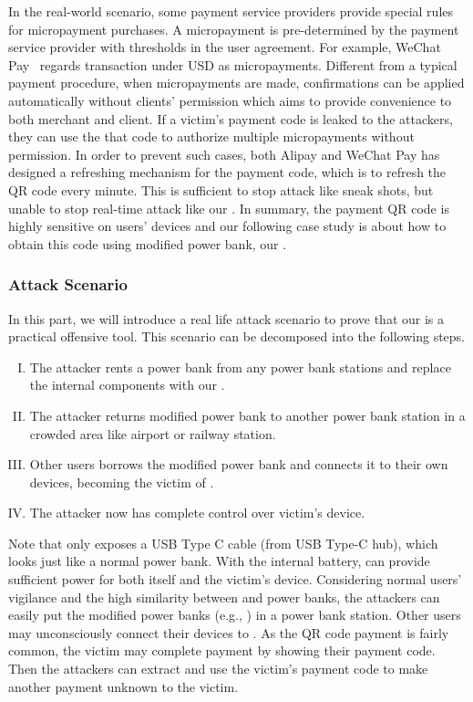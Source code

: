 In the real-world scenario, some payment service providers provide special rules for micropayment purchases. 
A micropayment is pre-determined by the payment service provider with thresholds in the user agreement. 
For example, WeChat Pay~\cite{Wechat-pay} regards transaction under USD  as micropayments. 
Different from a typical payment procedure, when micropayments are made, confirmations can be applied automatically without clients' permission which aims to provide convenience to both merchant and client.
If a victim's payment code is leaked to the attackers, they can use the that code to authorize multiple micropayments without permission. 
In order to prevent such cases, both Alipay and WeChat Pay has designed a refreshing mechanism for the payment code, which is to refresh the QR code every minute. This is sufficient to stop attack like sneak shots, but unable to stop real-time attack like our \tool.
In summary, the payment QR code is highly sensitive on users' devices and our following case study is about how to obtain this code using modified power bank, our \tool.

\subsubsection{Attack Scenario}
In this part, we will introduce a real life attack scenario to prove that our \tool is a practical offensive tool.
This scenario can be decomposed into the following steps.
\begin{enumerate}[I. ]
	\item The attacker rents a power bank from any power bank stations and replace the internal components with our \tool.
	\item The attacker returns modified power bank to another power bank station in a crowded area like airport or railway station.
	\item Other users borrows the modified power bank and connects it to their own devices, becoming the victim of \tool.
	\item The attacker now has complete control over victim's device.
\end{enumerate}

Note that \tool only exposes a USB Type C cable (from USB Type-C hub), which looks just like a normal power bank. With the internal battery, \tool can provide sufficient power for both itself and the victim's device.
Considering normal users' vigilance and the high similarity between \tool and power banks, the attackers can easily put the modified power banks (e.g., \tool) in a power bank station.
Other users may unconsciously connect their devices to \tool.
As the QR code payment is fairly common, the victim may complete payment by showing their payment code. 
Then the attackers can extract and use the victim's payment code to make another payment unknown to the victim.

